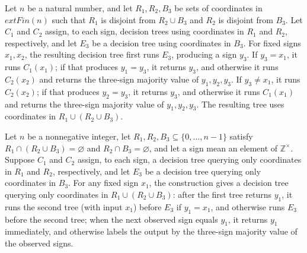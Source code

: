 \begin{definition}
\label{FABL.depthTwoFinishDifferent}
\leanok
{}
Let $n$ be a natural number, and let $R_1,R_2,B_3$ be sets of coordinates in
$	ext{Fin}(n)$ such that $R_1$ is disjoint from $R_2\cup B_3$ and $R_2$ is disjoint from
$B_3$. Let $C_1$ and $C_2$ assign, to each sign, decision trees using coordinates in
$R_1$ and $R_2$, respectively, and let $E_3$ be a decision tree using coordinates in
$B_3$. For fixed signs $x_1,x_2$, the resulting decision tree first runs $E_3$,
producing a sign $y_3$. If $y_3=x_1$, it runs $C_1(x_1)$; if that produces $y_1=y_3$, it
returns $y_3$, and otherwise it runs $C_2(x_2)$ and returns the three-sign majority
value of $y_1,y_2,y_3$. If $y_3\ne x_1$, it runs $C_2(x_2)$; if that produces $y_2=y_3$,
it returns $y_3$, and otherwise it runs $C_1(x_1)$ and returns the three-sign majority
value of $y_1,y_2,y_3$. The resulting tree uses coordinates in $R_1\cup(R_2\cup B_3)$.
\end{definition}

\begin{definition}
\label{FABL.depthTwoFinishEqual}
\leanok
{}
Let $n$ be a nonnegative integer, let $R_1,R_2,B_3\subseteq\{0,\ldots,n-1\}$ satisfy
$R_1\cap(R_2\cup B_3)=\varnothing$ and $R_2\cap B_3=\varnothing$, and let a sign mean an
element of $\mathbb Z^\times$. Suppose $C_1$ and $C_2$ assign, to each sign, a decision
tree querying only coordinates in $R_1$ and $R_2$, respectively, and let $E_3$ be a
decision tree querying only coordinates in $B_3$. For any fixed sign $x_1$, the
construction gives a decision tree querying only coordinates in $R_1\cup(R_2\cup B_3)$:
after the first tree returns $y_1$, it runs the second tree (with input $x_1$) before
$E_3$ if $y_1=x_1$, and otherwise runs $E_3$ before the second tree; when the next
observed sign equals $y_1$, it returns $y_1$ immediately, and otherwise labels the
output by the three-sign majority value of the observed signs.
\end{definition}

